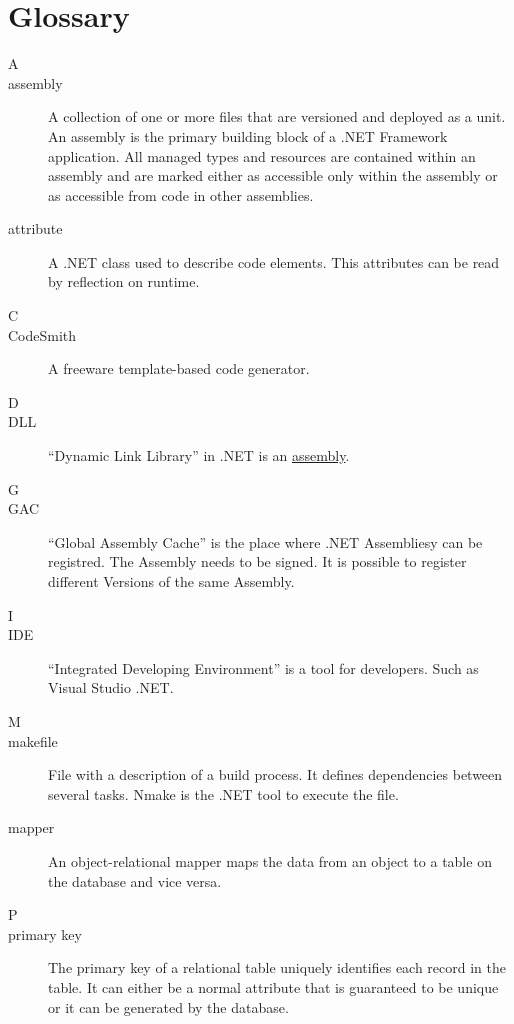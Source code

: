 \chapter{Glossary}

\begin{description}

\item[\Large{A}]
	\hypertarget{assembly}{}
	\item[assembly] A collection of one or more files that are versioned and deployed as a unit. 
									An assembly is the primary building block of a .NET Framework application. 
									All managed types and resources are contained within an assembly and are 
									marked either as accessible only within the assembly or as accessible from 
									code in other assemblies.

	\item[attribute] A .NET class used to describe code elements. This attributes can be read by reflection on runtime.

\item[\Large{C}]
	\item[CodeSmith] A freeware template-based code generator.

\item[\Large{D}]
	\item[DLL] ``Dynamic Link Library'' in .NET is an \hyperlink{assembly}{assembly}.

\item[\Large{G}]
	\item[GAC] ``Global Assembly Cache'' is the place where .NET Assembliesy can be registred. The 
	           Assembly needs to be signed. It is possible to register different Versions of the 
	           same Assembly.

\item[\Large{I}]
	\item[IDE] ``Integrated Developing Environment'' is a tool for developers. Such as Visual Studio .NET.

\item[\Large{M}]
	\item[makefile] File with a description of a build process. It defines dependencies between several tasks. Nmake is the .NET tool to execute the file.
	\item[mapper] An object-relational mapper maps the data from an object to a table on the database and vice versa.
	
\item[\Large{P}]
	\item[primary key] The primary key of a relational table uniquely identifies each record in the table. 
	It can either be a normal attribute that is guaranteed to be unique or it can be generated by the database.


\end{description}
